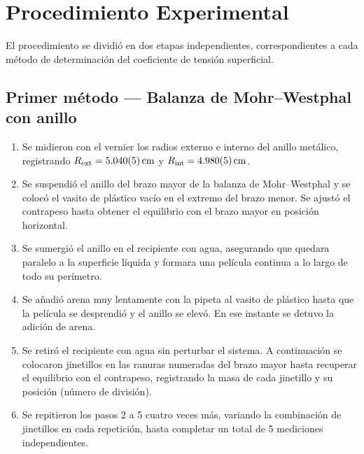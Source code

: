 
\section{Procedimiento Experimental}

El procedimiento se dividió en dos etapas independientes, correspondientes
a cada método de determinación del coeficiente de tensión superficial.

\subsection{Primer método — Balanza de Mohr--Westphal con anillo}

\begin{enumerate}
    \item Se midieron con el vernier los radios externo e interno del anillo
    metálico, registrando $R_{\text{ext}} = \qty{5.040 \pm 0.005}{\centi\meter}$ y
    $R_{\text{int}} = \qty{4.980 \pm 0.005}{\centi\meter}$.

    \item Se suspendió el anillo del brazo mayor de la balanza de
    Mohr--Westphal y se colocó el vasito de plástico vacío en el extremo
    del brazo menor. Se ajustó el contrapeso hasta obtener el equilibrio
    con el brazo mayor en posición horizontal.

    \item Se sumergió el anillo en el recipiente con agua, asegurando que
    quedara paralelo a la superficie líquida y formara una película
    continua a lo largo de todo su perímetro.

    \item Se añadió arena muy lentamente con la pipeta al vasito de
    plástico hasta que la película se desprendió y el anillo se elevó.
    En ese instante se detuvo la adición de arena.

    \item Se retiró el recipiente con agua sin perturbar el sistema.
    A continuación se colocaron jinetillos en las ranuras numeradas del
    brazo mayor hasta recuperar el equilibrio con el contrapeso,
    registrando la masa de cada jinetillo y su posición (número de
    división).

    \item Se repitieron los pasos 2 a 5 cuatro veces más, variando la
    combinación de jinetillos en cada repetición, hasta completar un total
    de 5 mediciones independientes.
\end{enumerate}

